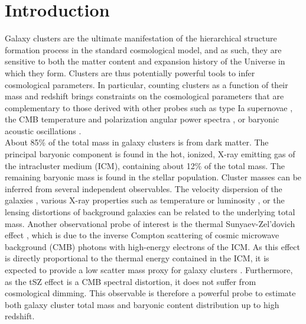 \documentclass[traditabstract]{aa}
\begin{document}
\section{Introduction}\label{sec:Introduction}
Galaxy clusters are the ultimate manifestation of the hierarchical structure formation process in the standard cosmological model, and as such, they are sensitive to both the matter content and expansion history of the Universe in which they form. Clusters are thus potentially powerful tools to infer cosmological parameters. In particular, counting clusters as a function of their mass and redshift \citep[\emph{e.g.,}][]{seh11,Planck_SZ_cosmo2015,deh16} brings constraints on the cosmological parameters that are complementary to those derived with other probes such as type Ia supernovae \citep[\emph{e.g.,}][]{rie07}, the CMB temperature and polarization angular power spectra \citep[\emph{e.g.,}][]{Planck_param}, or baryonic acoustic oscillations \citep[\emph{e.g.,}][]{and14}.\\
About 85\% of the total mass in galaxy clusters is from dark matter. The principal baryonic component is found in the hot, ionized, X-ray emitting gas of the intracluster medium (ICM), containing about 12\% of the total mass. The remaining baryonic mass is found in the stellar population.  Cluster masses can be inferred from several independent observables.
The velocity dispersion of the galaxies \citep[\emph{e.g.,}][]{biv06,sif16}, various X-ray properties such as temperature or luminosity \citep[\emph{e.g.,}][]{SVM_prof,pra09}, or the lensing distortions of background galaxies \citep[\emph{e.g.,}][]{app14,ume14,hoe15}  can be related to the underlying total mass. Another observational probe of interest is the thermal Sunyaev-Zel'dovich effect \citep[tSZ;][]{sun72}, which is due to the inverse Compton scattering of cosmic microwave background (CMB) photons with high-energy electrons of the ICM. As this effect is directly proportional to the thermal energy contained in the ICM, it is expected to provide a low scatter mass proxy for galaxy clusters \citep[\emph{e.g.,}][]{das04,nag07}. Furthermore, as the tSZ effect  is a CMB spectral distortion, it does not suffer from cosmological dimming. This observable is therefore a powerful probe to estimate both galaxy cluster total mass and baryonic content distribution up to high redshift.\\
\end{document}
